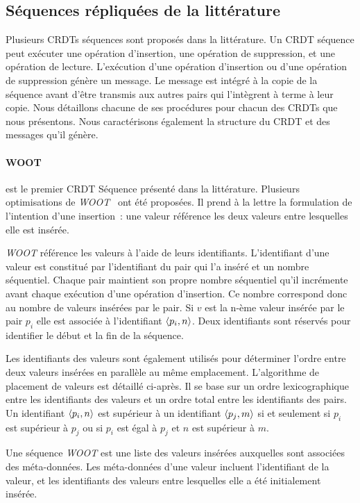 \subsection{Séquences répliquées de la littérature}

Plusieurs \acp{CRDT} séquences sont proposés dans la littérature.
Un \ac{CRDT} séquence peut exécuter une opération d'insertion, une opération de suppression, et une opération de lecture.
L'exécution d'une opération d'insertion ou d'une opération de suppression génère un message.
Le message est intégré à la copie de la séquence avant d'être transmis aux autres pairs qui l'intègrent à terme à leur copie.
Nous détaillons chacune de ses procédures pour chacun des \acp{CRDT} que nous présentons.
Nous caractérisons également la structure du \ac{CRDT} et des messages qu'il génère.

\paragraph{WOOT}\autocite{oster_2006_woot} est le premier \ac{CRDT} Séquence présenté dans la littérature.
Plusieurs optimisations de \emph{WOOT}~\autocite{weiss2007wooki,ahmednacer2011evaluatingcrdts} ont été proposées.
Il prend à la lettre la formulation de l'intention d'une insertion~: une valeur référence les deux valeurs entre lesquelles elle est insérée.

\emph{WOOT} référence les valeurs à l'aide de leurs identifiants.
L'identifiant d'une valeur est constitué par l'identifiant du pair qui l'a inséré et un nombre séquentiel.
Chaque pair maintient son propre nombre séquentiel qu'il incrémente avant chaque exécution d'une opération d'insertion.
Ce nombre correspond donc au nombre de valeurs insérées par le pair.
Si $v$ est la n-ème valeur insérée par le pair $p_i$ elle est associée à l'identifiant $\tuple*{p_i, n}$.
Deux identifiants sont réservés pour identifier le début et la fin de la séquence.

Les identifiants des valeurs sont également utilisés pour déterminer l'ordre entre deux valeurs insérées en parallèle au même emplacement.
L'algorithme de placement de valeurs est détaillé ci-après.
Il se base sur un ordre lexicographique entre les identifiants des valeurs et un ordre total entre les identifiants des pairs.
Un identifiant $\tuple*{p_i, n}$ est supérieur à un identifiant $\tuple*{p_j, m}$ si et seulement si $p_i$ est supérieur à $p_j$ ou si $p_i$ est égal à $p_j$ et $n$ est supérieur à $m$.

Une séquence \emph{WOOT} est une liste des valeurs insérées auxquelles sont associées des méta-données.
Les méta-données d'une valeur incluent l'identifiant de la valeur, et les identifiants des valeurs entre lesquelles elle a été initialement insérée.

